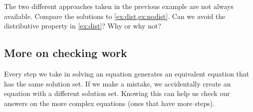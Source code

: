 \begin{boxex}

\end{boxex}

The two different approaches taken in the previous example are not always available. Compare the solutions to \cref{ex:dist,ex:nodist}. Can we avoid the distributive property in \cref{ex:dist}? Why or why not?


\subsection{More on checking work}

Every step we take in solving an equation generates an equivalent equation that has the same solution set. If we make a mistake, we accidentally create an equation with a different solution set. Knowing this can help us check our answers on the more complex equations (ones that have more steps).

